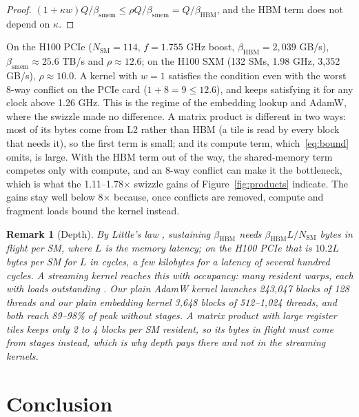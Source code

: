 \documentclass[10pt]{article}
\newtheorem{remark}{Remark}
\newcommand{\x}{\ensuremath{\times}}
\begin{document}
\begin{proof}
$(1+\kappa w)Q/\beta_{\mathrm{smem}} \le \rho Q / \beta_{\mathrm{smem}} = Q/\beta_{\mathrm{HBM}}$, and the HBM term does not
depend on $\kappa$.
\end{proof}

On the H100 PCIe ($N_{\mathrm{SM}}=114$, $f = 1.755$ GHz boost, $\beta_{\mathrm{HBM}} = 2{,}039$ GB/s), $\beta_{\mathrm{smem}}
\approx 25.6$ TB/s and $\rho \approx 12.6$; on the H100 SXM (132 SMs, 1.98 GHz, 3{,}352 GB/s), $\rho \approx 10.0$. A kernel
with $w=1$ satisfies the condition even with the worst 8-way conflict on the PCIe card ($1 + 8 = 9 \le 12.6$), and keeps
satisfying it for any clock above 1.26 GHz. This is the regime of the embedding lookup and AdamW, where the swizzle made no
difference. A matrix product is different in two ways: most of its bytes come from L2 rather than HBM (a tile is read by
every block that needs it), so the first term is small; and its compute term, which~\eqref{eq:bound} omits, is large. With
the HBM term out of the way, the shared-memory term competes only with compute, and an 8-way conflict can make it the
bottleneck, which is what the 1.11--1.78\x{} swizzle gains of Figure~\ref{fig:products} indicate. The gains stay well below
8\x{} because, once conflicts are removed, compute and fragment loads bound the kernel instead.

\begin{remark}[Depth]
By Little's law \citep{little1961proof}, sustaining $\beta_{\mathrm{HBM}}$ needs $\beta_{\mathrm{HBM}} L / N_{\mathrm{SM}}$
bytes in flight per SM, where $L$ is the memory latency; on the H100 PCIe that is $10.2 L$ bytes per SM for $L$ in cycles,
a few kilobytes for a latency of several hundred cycles. A streaming kernel reaches this with occupancy: many resident warps,
each with loads outstanding \citep{volkov2010better}. Our plain AdamW kernel launches 243{,}047 blocks of 128 threads and
our plain embedding kernel 3{,}648 blocks of 512--1{,}024 threads, and both reach 89--98\% of peak without stages. A
matrix product with large register tiles keeps only 2 to 4 blocks per SM resident, so its bytes in flight must come from
stages instead, which is why depth pays there and not in the streaming kernels.
\end{remark}

\section{Conclusion}
\end{document}
